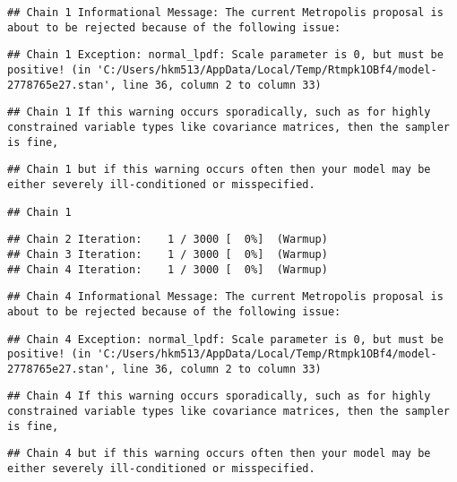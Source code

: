 \documentclass[
]{article}
\begin{document}
\begin{verbatim}
## Chain 1 Informational Message: The current Metropolis proposal is about to be rejected because of the following issue:
\end{verbatim}

\begin{verbatim}
## Chain 1 Exception: normal_lpdf: Scale parameter is 0, but must be positive! (in 'C:/Users/hkm513/AppData/Local/Temp/Rtmpk1OBf4/model-2778765e27.stan', line 36, column 2 to column 33)
\end{verbatim}

\begin{verbatim}
## Chain 1 If this warning occurs sporadically, such as for highly constrained variable types like covariance matrices, then the sampler is fine,
\end{verbatim}

\begin{verbatim}
## Chain 1 but if this warning occurs often then your model may be either severely ill-conditioned or misspecified.
\end{verbatim}

\begin{verbatim}
## Chain 1
\end{verbatim}

\begin{verbatim}
## Chain 2 Iteration:    1 / 3000 [  0%]  (Warmup) 
## Chain 3 Iteration:    1 / 3000 [  0%]  (Warmup) 
## Chain 4 Iteration:    1 / 3000 [  0%]  (Warmup)
\end{verbatim}

\begin{verbatim}
## Chain 4 Informational Message: The current Metropolis proposal is about to be rejected because of the following issue:
\end{verbatim}

\begin{verbatim}
## Chain 4 Exception: normal_lpdf: Scale parameter is 0, but must be positive! (in 'C:/Users/hkm513/AppData/Local/Temp/Rtmpk1OBf4/model-2778765e27.stan', line 36, column 2 to column 33)
\end{verbatim}

\begin{verbatim}
## Chain 4 If this warning occurs sporadically, such as for highly constrained variable types like covariance matrices, then the sampler is fine,
\end{verbatim}

\begin{verbatim}
## Chain 4 but if this warning occurs often then your model may be either severely ill-conditioned or misspecified.
\end{verbatim}
\end{document}
